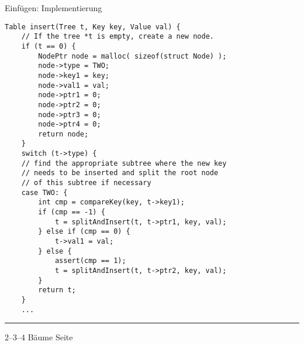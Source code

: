 
\begin{slide}{}
\normalsize

\begin{center}
Einf\"ugen: Implementierung
\end{center}
\vspace*{0.5cm}

\footnotesize
\begin{verbatim}
Table insert(Tree t, Key key, Value val) {
    // If the tree *t is empty, create a new node. 
    if (t == 0) {
        NodePtr node = malloc( sizeof(struct Node) );
        node->type = TWO;
        node->key1 = key;
        node->val1 = val;
        node->ptr1 = 0;
        node->ptr2 = 0;
        node->ptr3 = 0;
        node->ptr4 = 0;
        return node;
    }
    switch (t->type) {
    // find the appropriate subtree where the new key
    // needs to be inserted and split the root node
    // of this subtree if necessary
    case TWO: {
        int cmp = compareKey(key, t->key1);
        if (cmp == -1) {
            t = splitAndInsert(t, t->ptr1, key, val);
        } else if (cmp == 0) {
            t->val1 = val;
        } else {
            assert(cmp == 1);
            t = splitAndInsert(t, t->ptr2, key, val);
        }
        return t;
    }
    ...
\end{verbatim}


\vspace*{\fill}
\tiny \addtocounter{mypage}{1}
\rule{17cm}{1mm}
2--3--4 B\"aume  \hspace*{\fill} Seite 
\end{slide}


